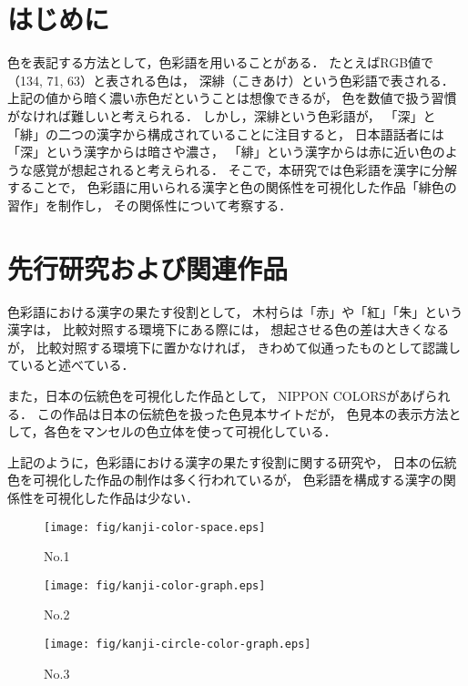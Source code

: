 \documentclass[a4j,twocolumn]{ujarticle} %
\newcommand{\workname}{緋色の習作}
\newcommand{\colorname}{色彩語}
\newcommand{\mysection}[1]{\vspace{-23pt}\section{#1}\vspace{-5pt}}
\begin{document}
\maketitle
\thispagestyle{empty}

\mysection{はじめに}

色を表記する方法として，\colorname{}を用いることがある．
たとえばRGB値で（134, 71, 63）と表される色は，
深緋（こきあけ）という\colorname{}で表される．
上記の値から暗く濃い赤色だということは想像できるが，
色を数値で扱う習慣がなければ難しいと考えられる．
しかし，深緋という\colorname{}が，
「深」と「緋」の二つの漢字から構成されていることに注目すると，
日本語話者には「深」という漢字からは暗さや濃さ，
「緋」という漢字からは赤に近い色のような感覚が想起されると考えられる．
そこで，本研究では\colorname{}を漢字に分解することで，
\colorname{}に用いられる漢字と色の関係性を可視化した作品「\workname{}」を制作し，
その関係性について考察する．

\mysection{先行研究および関連作品}

色彩語における漢字の果たす役割として，
木村ら\cite{Kimura1998}は「赤」や「紅」「朱」という漢字は，
比較対照する環境下にある際には，
想起させる色の差は大きくなるが，
比較対照する環境下に置かなければ，
きわめて似通ったものとして認識していると述べている．

また，日本の伝統色を可視化した作品として，
NIPPON COLORS\cite{NipponColors}があげられる．
この作品は日本の伝統色を扱った色見本サイトだが，
色見本の表示方法として，各色をマンセルの色立体を使って可視化している．

上記のように，色彩語における漢字の果たす役割に関する研究や，
日本の伝統色を可視化した作品の制作は多く行われているが，
色彩語を構成する漢字の関係性を可視化した作品は少ない．

\vspace{-1zh}

\begin{figure*}[h]
  \begin{center}
    \begin{minipage}{0.3\hsize}
      \begin{center}
        \texttt{[image: fig/kanji-color-space.eps]}
      \end{center}
      \caption{No.1}
      \label{fig:no1}
    \end{minipage}
    \begin{minipage}{0.3\hsize}
      \begin{center}
        \texttt{[image: fig/kanji-color-graph.eps]}
      \end{center}
      \caption{No.2}
      \label{fig:no2}
    \end{minipage}
    \begin{minipage}{0.3\hsize}
      \begin{center}
        \texttt{[image: fig/kanji-circle-color-graph.eps]}
      \end{center}
      \caption{No.3}
      \label{fig:no3}
    \end{minipage}
  \end{center}
\end{figure*}
\end{document}
